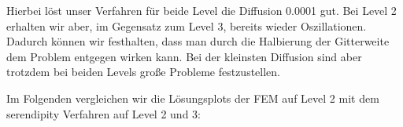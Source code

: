 Hierbei löst unser Verfahren für beide Level die Diffusion 0.0001 gut. Bei Level 2 erhalten wir aber, im Gegensatz zum Level 3, bereits wieder Oszillationen. Dadurch können wir festhalten, dass man durch die Halbierung der Gitterweite dem Problem entgegen wirken kann. Bei der kleinsten Diffusion sind aber trotzdem bei beiden Levels große Probleme festzustellen.

Im Folgenden vergleichen wir die Lösungsplots der FEM auf Level 2 mit dem serendipity Verfahren auf Level 2 und 3:
 
\begin{figure}[H]
	\centering
\end{figure}

